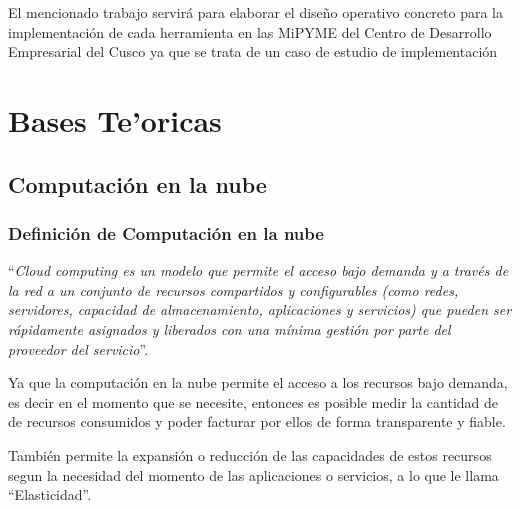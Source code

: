 El mencionado trabajo servir\'a para elaborar el dise\~no operativo concreto para la
implementaci\'on de cada herramienta en las MiPYME del Centro de Desarrollo
Empresarial del Cusco ya que se trata de un caso de estudio de implementaci\'on

\section{Bases Te'oricas}

\subsection{Computaci\'on en la nube}

\subsubsection{Definici\'on de Computaci\'on en la nube}
``\emph{Cloud computing es un modelo que permite el acceso bajo demanda y a trav\'es de
la red a un conjunto de recursos compartidos y configurables (como redes,
servidores, capacidad de almacenamiento, aplicaciones y servicios) que pueden
ser r\'apidamente asignados y liberados con una m\'inima gesti\'on por parte del
proveedor del servicio}''\citep{cierco}.

Ya que la computaci\'on en la nube permite el acceso a los recursos bajo demanda,
es decir en el momento que se necesite, entonces es posible medir la cantidad de
de recursos consumidos y poder facturar por ellos de forma transparente y fiable.

Tambi\'en permite la expansi\'on o reducci\'on de las capacidades de estos
recursos segun la necesidad del momento de las aplicaciones o servicios, a lo
que le llama ``Elasticidad''.


